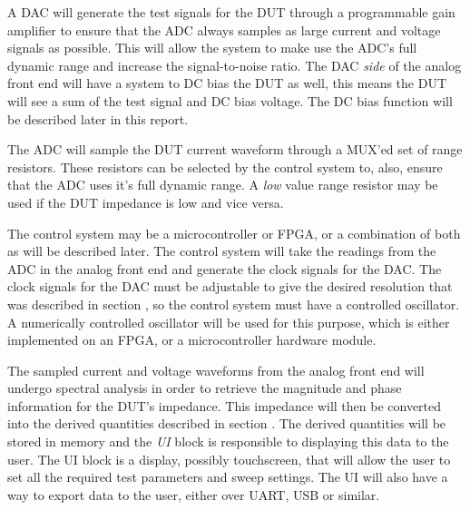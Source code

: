 A DAC will generate the test signals for the DUT through a programmable gain amplifier to ensure that the ADC always samples as large current and voltage signals as possible. This will allow the system to make use the ADC's full dynamic range and increase the signal-to-noise ratio. The DAC \textit{side} of the analog front end will have a system to DC bias the DUT as well, this means the DUT will see a sum of the test signal and DC bias voltage. The DC bias function will be described later in this report.

The ADC will sample the DUT current waveform through a MUX'ed set of range resistors. These resistors can be selected by the control system to, also, ensure that the ADC uses it's full dynamic range. A \textit{low} value range resistor may be used if the DUT impedance is low and vice versa.

The control system may be a microcontroller or FPGA, or a combination of both as will be described later. The control system will take the readings from the ADC in the analog front end and generate the clock signals for the DAC. The clock signals for the DAC must be adjustable to give the desired resolution that was described in section , so the control system must have a controlled oscillator. A numerically controlled oscillator will be used for this purpose, which is either implemented on an FPGA, or a microcontroller hardware module. 

The sampled current and voltage waveforms from the analog front end will undergo spectral analysis in order to retrieve the magnitude and phase information for the DUT's impedance. This impedance will then be converted into the derived quantities described in section . The derived quantities will be stored in memory and the \textit{UI} block is responsible to displaying this data to the user. The UI block is a display, possibly touchscreen, that will allow the user to set all the required test parameters and sweep settings. The UI will also have a way to export data to the user, either over UART, USB or similar. 
